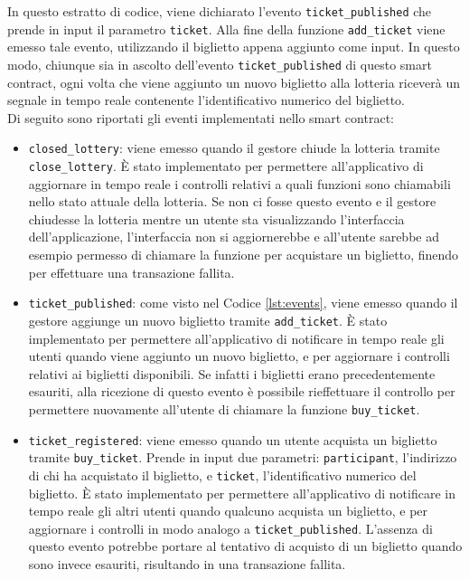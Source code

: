 \documentclass[12pt,a4paper,openright,twoside]{report}
\begin{document}
In questo estratto di codice, viene dichiarato l'evento \texttt{ticket\_published} che prende in input il parametro \texttt{ticket}. Alla fine della funzione \texttt{add\_ticket} viene emesso tale evento, utilizzando il biglietto appena aggiunto come input. In questo modo, chiunque sia in ascolto dell'evento \texttt{ticket\_published} di questo smart contract, ogni volta che viene aggiunto un nuovo biglietto alla lotteria riceverà un segnale in tempo reale contenente l'identificativo numerico del biglietto.\\
Di seguito sono riportati gli eventi implementati nello smart contract:
\begin{itemize}
    \item \texttt{closed\_lottery}: viene emesso quando il gestore chiude la lotteria tramite \texttt{close\_lottery}. È stato implementato per permettere all'applicativo di aggiornare in tempo reale i controlli relativi a quali funzioni sono chiamabili nello stato attuale della lotteria. Se non ci fosse questo evento e il gestore chiudesse la lotteria mentre un utente sta visualizzando l'interfaccia dell'applicazione, l'interfaccia non si aggiornerebbe e all'utente sarebbe ad esempio permesso di chiamare la funzione per acquistare un biglietto, finendo per effettuare una transazione fallita.
    \item \texttt{ticket\_published}: come visto nel Codice \ref{lst:events}, viene emesso quando il gestore aggiunge un nuovo biglietto tramite \texttt{add\_ticket}. È stato implementato per permettere all'applicativo di notificare in tempo reale gli utenti quando viene aggiunto un nuovo biglietto, e per aggiornare i controlli relativi ai biglietti disponibili. Se infatti i biglietti erano precedentemente esauriti, alla ricezione di questo evento è possibile rieffettuare il controllo per permettere nuovamente all'utente di chiamare la funzione \texttt{buy\_ticket}.
    \item \texttt{ticket\_registered}: viene emesso quando un utente acquista un biglietto tramite \texttt{buy\_ticket}. Prende in input due parametri: \texttt{participant}, l'indirizzo di chi ha acquistato il biglietto, e \texttt{ticket}, l'identificativo numerico del biglietto. È stato implementato per permettere all'applicativo di notificare in tempo reale gli altri utenti quando qualcuno acquista un biglietto, e per aggiornare i controlli in modo analogo a \texttt{ticket\_published}. L'assenza di questo evento potrebbe portare al tentativo di acquisto di un biglietto quando sono invece esauriti, risultando in una transazione fallita.
\end{itemize}
\end{document}
